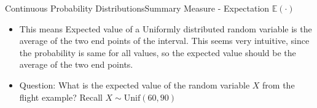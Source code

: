 \documentclass[8pt, usepdftitle = false]{beamer}
\begin{document}
\begin{frame}[allowframebreaks]{Continuous Probability Distributions}{Summary Measure - Expectation $\mathbb{E}(\cdot)$}
\begin{itemize}
\begin{align*}
	\mathbb{E}(X) &= \int_{-\infty}^{\infty} x f(x) d x = \int_{a}^{b} x \frac{1}{b-a} dx = \frac{1}{b-a} \int_{a}^{b} x dx = \frac{1}{b-a} \left[\frac{x^2}{2}\right]_{a}^{b} \\
	&= \frac{1}{2(b-a)} \left[x^2\right]_{a}^{b} = \frac{1}{2(b-a)} \left[b^2 - a^2\right]  = \frac{b^2 - a^2}{2(b-a)} = \frac{(b+a)(b-a)}{2(b-a)} = \frac{b+a}{2}
\end{align*}


\item This means Expected value of a Uniformly distributed random variable is the average of the two end points of the interval. This seems very intuitive, since the probability is same for all values, so the expected value should be the average of the two end points. 

\item Question: What is the expected value of the random variable $X$ from the flight example? Recall $X \sim \mathrm{Unif}(60, 90)$










\end{itemize} 


\end{frame}




\end{document}
